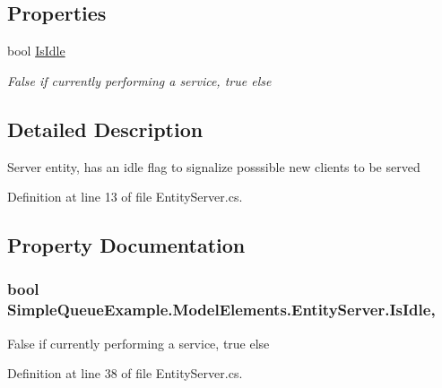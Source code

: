 \subsection*{Properties}
\begin{DoxyCompactItemize}
\item 
bool \hyperlink{class_simple_queue_example_1_1_model_elements_1_1_entity_server_a1ded582653c2c3746b5cc34e513e74ee}{Is\+Idle}
\begin{DoxyCompactList}\small\item\em False if currently performing a service, true else \end{DoxyCompactList}\end{DoxyCompactItemize}


\subsection{Detailed Description}
Server entity, has an idle flag to signalize posssible new clients to be served 



Definition at line 13 of file Entity\+Server.\+cs.



\subsection{Property Documentation}
\subsubsection[{\texorpdfstring{Is\+Idle}{IsIdle}}]{\setlength{\rightskip}{0pt plus 5cm}bool Simple\+Queue\+Example.\+Model\+Elements.\+Entity\+Server.\+Is\+Idle\hspace{0.3cm}{\ttfamily [get]}, {\ttfamily [set]}}\hypertarget{class_simple_queue_example_1_1_model_elements_1_1_entity_server_a1ded582653c2c3746b5cc34e513e74ee}{}\label{class_simple_queue_example_1_1_model_elements_1_1_entity_server_a1ded582653c2c3746b5cc34e513e74ee}


False if currently performing a service, true else 



Definition at line 38 of file Entity\+Server.\+cs.

